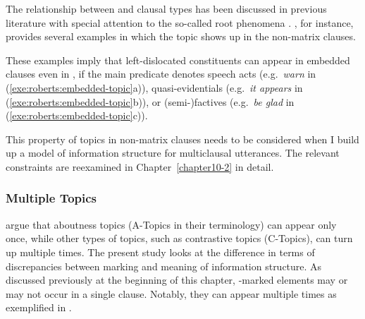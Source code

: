 The relationship between  and clausal types has been discussed in
previous literature with special attention to the so-called root
phenomena
\citep{haegeman:04,heycock:07,bianchi:frascarelli:10,roberts:11}.
\citeauthor{roberts:11}, for instance, provides several 
examples in which the topic shows up in the non-matrix clauses.



\noindent These examples imply that left-dislocated constituents can
appear in embedded clauses even in , if the main predicate
denotes speech acts (e.g.\ \textit{warn} in
(\ref{exe:roberts:embedded-topic}a)), quasi-evidentials
(e.g.\ \textit{it appears} in (\ref{exe:roberts:embedded-topic}b)), or
(semi-)factives (e.g.\ \textit{be glad} in
(\ref{exe:roberts:embedded-topic}c)).



This property of topics in non-matrix clauses needs to be considered
when I build up a model of information structure for multiclausal
utterances. The relevant constraints are reexamined in
Chapter~\ref{chapter10-2} in detail.




\subsubsection{Multiple Topics}
\label{3:sssec:multiple-topics}

\citet{bianchi:frascarelli:10} argue that aboutness topics (A-Topics
in their terminology) can appear only once, while other types of
topics, such as contrastive topics (C-Topics), can turn up multiple
times.  The present study looks at the difference in terms of
discrepancies between marking and meaning of information structure.
As discussed previously at the beginning of this chapter, -marked
elements may or may not occur in a single clause. Notably, they can
appear multiple times as exemplified in
.


